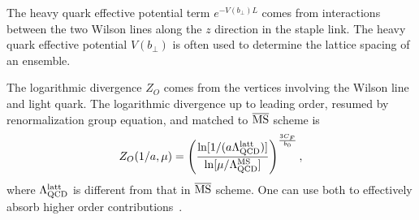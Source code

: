 \documentclass[prd,aps,twocolumn,preprintnumbers, showpacs, nofootinbib,superscriptaddress,notitlepage]{revtex4-1}
\begin{document}
The heavy quark effective potential term $e^{-V(b_{\perp})L}$ comes from interactions between the two Wilson lines along the $z$ direction in the staple link. The heavy quark effective potential $V(b_{\perp})$ is often used to determine the lattice spacing of an ensemble.  

\begin{comment}
One can study the Wilson line with heavy quark effective theory and calculate the logarithmic  divergence $Z_{O}$  from the light-heavy quark vertex perturbatively at leading order~\cite{Ji:2020ect,Constantinou:2017sej}:
\begin{align}
Z_{O} = 1+\frac{3 C_{F} \alpha_{s}}{2 \pi} \frac{1}{4-D}, 
\end{align}
with $D$ being the space-time dimension. 
The logarithmic  divergence up to next-to-leading order, resumed by renormalization group equation, and matched to lattice is~\cite{Ji:1991pr, LatticePartonCollaborationLPC:2021xdx} 
\begin{align}\label{eq:ZO_RS_higher}
Z_{O}(1/a, \mu)=\left(\frac{\ln [1 /(a \Lambda_{\rm QCD})]}{\ln [\mu / \Lambda_{\rm QCD}]}\right)^{\frac{3 C_{F}}{b_0}}\left(1+\frac{d}{\ln[a \Lambda_{\rm QCD}]}\right),\nonumber\\
\end{align}
where $\Lambda_{\rm QCD}$ is different from that of the $\overline{\rm MS}$ scheme and lattice perturbation theory. One can use it to effectively absorb higher order contributions~\cite{Lepage:1992xa}. $d$ is the next to leading order anomalous dimension which contains scheme conversion constants. Both $\Lambda_{\rm QCD}$ and $d$ depend on the specific lattice action.  
\end{comment}

The logarithmic divergence $Z_{O}$ comes from the vertices
involving the Wilson line and light quark. The logarithmic  divergence up to leading order, resumed by renormalization group equation, and matched to  $\overline{\rm MS}$ scheme is~\cite{Ji:1991pr, LatticePartonCollaborationLPC:2021xdx} 
\begin{align}\label{eq:ZO_RS_higher}
Z_{O}(1/a, \mu)=\left(\frac{\ln [1 /(a \Lambda_{\rm QCD}^{\rm latt})]}{\ln [\mu / \Lambda_{\rm QCD}^{\rm MS}]}\right)^{\frac{3 C_{F}}{b_0}},\nonumber\\
\end{align}
where $\Lambda_{\rm QCD}^{\rm latt}$  is different from that in $\overline{\rm MS}$ scheme. One can use both to effectively absorb higher order contributions~\cite{Lepage:1992xa}.
\end{document}
